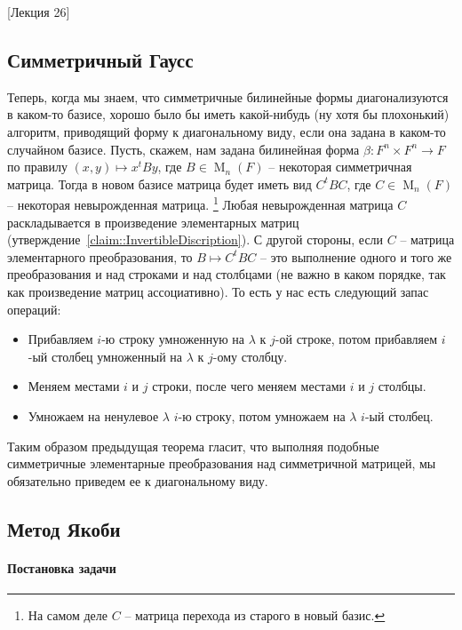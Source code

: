 [Лекция 26]


\subsection{Симметричный Гаусс}

Теперь, когда мы знаем, что симметричные билинейные формы диагонализуются в каком-то базисе, хорошо было бы иметь какой-нибудь (ну хотя бы плохонький) алгоритм, приводящий форму к диагональному виду, если она задана в каком-то случайном базисе.
Пусть, скажем, нам задана билинейная форма $\beta\colon F^n \times F^n\to F$ по правилу $(x,y)\mapsto x^t By$, где $B\in \operatorname{M}_n(F)$ -- некоторая симметричная матрица.
Тогда в  новом базисе матрица будет иметь вид $C^t B C$, где $C\in \operatorname{M}_n(F)$ -- некоторая невырожденная матрица.%
\footnote{На самом деле $C$ -- матрица перехода из старого в новый базис.}
Любая невырожденная матрица $C$ раскладывается в произведение элементарных матриц (утверждение~\ref{claim::InvertibleDiscription}).
С другой стороны, если $C$ -- матрица элементарного преобразования, то $B \mapsto C^tBC$ -- это выполнение одного и того же преобразования и над строками и над столбцами (не важно в каком порядке, так как произведение матриц ассоциативно).
То есть у нас есть следующий запас операций:
\begin{itemize}
\item Прибавляем $i$-ю строку умноженную на $\lambda$ к $j$-ой строке, потом прибавляем $i$-ый столбец умноженный на $\lambda$ к $j$-ому столбцу.

\item Меняем местами $i$ и $j$ строки, после чего меняем местами $i$ и $j$ столбцы.

\item Умножаем на ненулевое $\lambda$ $i$-ю строку, потом умножаем на $\lambda$ $i$-ый столбец.
\end{itemize}
Таким образом предыдущая теорема гласит, что выполняя подобные симметричные элементарные преобразования над симметричной матрицей, мы обязательно приведем ее к диагональному виду.


\subsection{Метод Якоби}
\label{subsection::Jacoby}

\paragraph{Постановка задачи}

